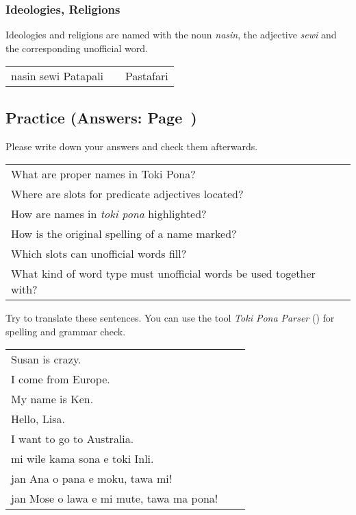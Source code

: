 %
\subsubsection*{Ideologies, Religions}
%

Ideologies and religions are named with the noun \textit{nasin}, the adjective \textit{sewi} and the corresponding unofficial word. 

\begin{supertabular}{p{5,5cm}|ll}
nasin sewi Patapali && Pastafari \\
\end{supertabular}

%
\newpage
\subsection*{Practice (Answers: Page~\pageref{'unofficial_words'})}
%
Please write down your answers and check them afterwards. 

\begin{supertabular}{p{5,5cm}|ll}
What are proper names in Toki Pona? &&  \\ %
Where are slots for predicate adjectives located? &&  \\ %
How are names in \textit{toki pona} highlighted? &&  \\ %
How is the original spelling of a name marked? &&  \\ %
Which slots can unofficial words fill? &&  \\ %
What kind of word type must unofficial words be used together with? &&  \\ %
\end{supertabular}

Try to translate these sentences. 
You can use the tool \textit{Toki Pona Parser} (\cite{www:rowa:02}) for spelling and grammar check. 

\begin{supertabular}{p{5,5cm}|ll}
Susan is crazy.  &&   \\ %
I come from Europe. &&  \\ %
My name is Ken.  &&   \\ %
Hello, Lisa.  &&   \\ %
I want to go to Australia. &&   \\ %
mi wile kama sona e toki Inli.  &&   \\ %
jan Ana o pana e moku, tawa mi!  &&   \\ %
jan Mose o lawa e mi mute, tawa ma pona!  &&   \\ %
\end{supertabular} 

%

